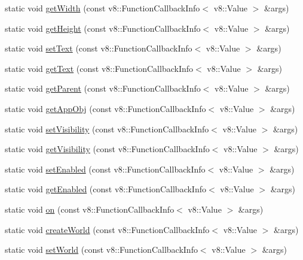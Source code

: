 \begin{DoxyCompactItemize}
\item 
static void \mbox{\hyperlink{class_rad_j_a_v_1_1_g_u_i_1_1_canvas3_d_a1eae6d671942691683c551bac4390028}{get\+Width}} (const v8\+::\+Function\+Callback\+Info$<$ v8\+::\+Value $>$ \&args)
\item 
static void \mbox{\hyperlink{class_rad_j_a_v_1_1_g_u_i_1_1_canvas3_d_adb189ca381dcf88673d164336e94d7f2}{get\+Height}} (const v8\+::\+Function\+Callback\+Info$<$ v8\+::\+Value $>$ \&args)
\item 
static void \mbox{\hyperlink{class_rad_j_a_v_1_1_g_u_i_1_1_canvas3_d_a9470c0233ee76d8ed5d296a62f6704b4}{set\+Text}} (const v8\+::\+Function\+Callback\+Info$<$ v8\+::\+Value $>$ \&args)
\item 
static void \mbox{\hyperlink{class_rad_j_a_v_1_1_g_u_i_1_1_canvas3_d_a5bbdf54a71c3e65fab45231ee7571175}{get\+Text}} (const v8\+::\+Function\+Callback\+Info$<$ v8\+::\+Value $>$ \&args)
\item 
static void \mbox{\hyperlink{class_rad_j_a_v_1_1_g_u_i_1_1_canvas3_d_afa45c5e1fdea0a1a028a264d1c2c0e1b}{get\+Parent}} (const v8\+::\+Function\+Callback\+Info$<$ v8\+::\+Value $>$ \&args)
\item 
static void \mbox{\hyperlink{class_rad_j_a_v_1_1_g_u_i_1_1_canvas3_d_af873318dd5011d56be49084e2fa8abfd}{get\+App\+Obj}} (const v8\+::\+Function\+Callback\+Info$<$ v8\+::\+Value $>$ \&args)
\item 
static void \mbox{\hyperlink{class_rad_j_a_v_1_1_g_u_i_1_1_canvas3_d_afcdb67bfbd93ab94e094bdd56aeaa397}{set\+Visibility}} (const v8\+::\+Function\+Callback\+Info$<$ v8\+::\+Value $>$ \&args)
\item 
static void \mbox{\hyperlink{class_rad_j_a_v_1_1_g_u_i_1_1_canvas3_d_ae6a1b3b03d1a25f480a077c0e9acb2cc}{get\+Visibility}} (const v8\+::\+Function\+Callback\+Info$<$ v8\+::\+Value $>$ \&args)
\item 
static void \mbox{\hyperlink{class_rad_j_a_v_1_1_g_u_i_1_1_canvas3_d_a5da056cba6cbb93c2954000384ab404c}{set\+Enabled}} (const v8\+::\+Function\+Callback\+Info$<$ v8\+::\+Value $>$ \&args)
\item 
static void \mbox{\hyperlink{class_rad_j_a_v_1_1_g_u_i_1_1_canvas3_d_ac8b768c038924e40ae05d8057d061de4}{get\+Enabled}} (const v8\+::\+Function\+Callback\+Info$<$ v8\+::\+Value $>$ \&args)
\item 
static void \mbox{\hyperlink{class_rad_j_a_v_1_1_g_u_i_1_1_canvas3_d_a7fac45ffa39b9158743a0c8925e013fe}{on}} (const v8\+::\+Function\+Callback\+Info$<$ v8\+::\+Value $>$ \&args)
\item 
static void \mbox{\hyperlink{class_rad_j_a_v_1_1_g_u_i_1_1_canvas3_d_ac0f310f59c986dc860afe2d4ebcd42bf}{create\+World}} (const v8\+::\+Function\+Callback\+Info$<$ v8\+::\+Value $>$ \&args)
\item 
static void \mbox{\hyperlink{class_rad_j_a_v_1_1_g_u_i_1_1_canvas3_d_abf4f4a3a528ab83c52b6b6b311d1a437}{set\+World}} (const v8\+::\+Function\+Callback\+Info$<$ v8\+::\+Value $>$ \&args)
\end{DoxyCompactItemize}


